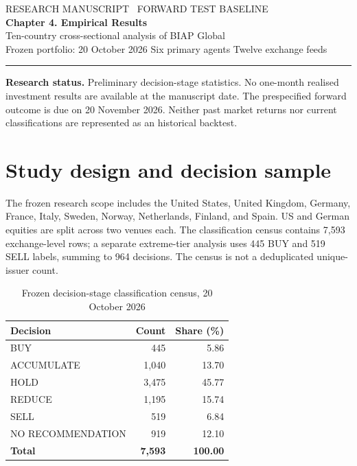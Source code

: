 \documentclass[11pt,a4paper]{article}
\begin{document}
{\color{AccentTeal}\small RESEARCH MANUSCRIPT \textbar\ FORWARD TEST BASELINE}\\[5pt]
{\color{MidnightBlue}\LARGE\bfseries Chapter 4. Empirical Results}\\[5pt]
{\large Ten-country cross-sectional analysis of BIAP Global}\\[5pt]
{\small Frozen portfolio: 20 October 2026 \quad\textbar\quad Six primary agents \quad\textbar\quad Twelve exchange feeds}\\
\noindent\rule{\linewidth}{0.8pt}

\noindent\textbf{Research status.} Preliminary decision-stage statistics. No one-month realised investment results are available at the manuscript date. The prespecified forward outcome is due on 20 November 2026. Neither past market returns nor current classifications are represented as an historical backtest.

\section{Study design and decision sample}
The frozen research scope includes the United States, United Kingdom, Germany, France, Italy, Sweden, Norway, Netherlands, Finland, and Spain. US and German equities are split across two venues each. The classification census contains 7,593 exchange-level rows; a separate extreme-tier analysis uses 445 BUY and 519 SELL labels, summing to 964 decisions. The census is not a deduplicated unique-issuer count.

\begin{table}[ht]
\centering\small
\caption{Frozen decision-stage classification census, 20 October 2026}
\begin{tabular}{lrr}\toprule
Decision & Count & Share (\%)\\\midrule
BUY & 445 & 5.86\\
ACCUMULATE & 1,040 & 13.70\\
HOLD & 3,475 & 45.77\\
REDUCE & 1,195 & 15.74\\
SELL & 519 & 6.84\\
NO RECOMMENDATION & 919 & 12.10\\\midrule
\textbf{Total} & \textbf{7,593} & \textbf{100.00}\\\bottomrule
\end{tabular}
\label{tab:classification}
\end{table}
\end{document}
